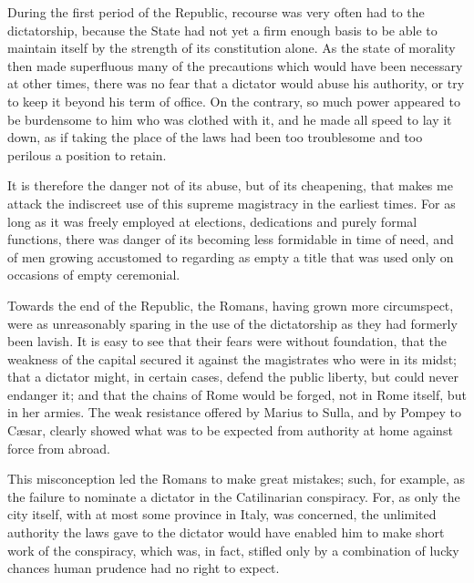 \documentclass[12pt]{report}
\begin{document}
During the first period of the Republic, recourse was very often had to the dictatorship, because the State had not yet a firm enough basis to be able to maintain itself by the strength of its constitution alone. As the state of morality then made superfluous many of the precautions which would have been necessary at other times, there was no fear that a dictator would abuse his authority, or try to keep it beyond his term of office. On the contrary, so much power appeared to be burdensome to him who was clothed with it, and he made all speed to lay it down, as if taking the place of the laws had been too troublesome and too perilous a position to retain.

It is therefore the danger not of its abuse, but of its cheapening, that makes me attack the indiscreet use of this supreme magistracy in the earliest times. For as long as it was freely employed at elections, dedications and purely formal functions, there was danger of its becoming less formidable in time of need, and of men growing accustomed to regarding as empty a title that was used only on occasions of empty ceremonial.

Towards the end of the Republic, the Romans, having grown more circumspect, were as unreasonably sparing in the use of the dictatorship as they had formerly been lavish. It is easy to see that their fears were without foundation, that the weakness of the capital secured it against the magistrates who were in its midst; that a dictator might, in certain cases, defend the public liberty, but could never endanger it; and that the chains of Rome would be forged, not in Rome itself, but in her armies. The weak resistance offered by Marius to Sulla, and by Pompey to Cæsar, clearly showed what was to be expected from authority at home against force from abroad.

This misconception led the Romans to make great mistakes; such, for example, as the failure to nominate a dictator in the Catilinarian conspiracy. For, as only the city itself, with at most some province in Italy, was concerned, the unlimited authority the laws gave to the dictator would have enabled him to make short work of the conspiracy, which was, in fact, stifled only by a combination of lucky chances human prudence had no right to expect.
\end{document}
